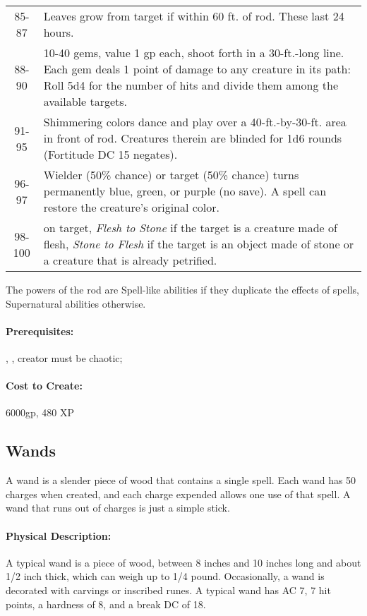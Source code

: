 \begin{table*}
\begin{tabular}{|c|p{}|}
85-87&Leaves grow from target if within 60 ft. of rod. These last 24 hours.\\
88-90&10-40 gems, value 1 gp each, shoot forth in a 30-ft.-long line. Each gem deals 1 point of damage to any creature in its path: Roll 5d4 for the number of hits and divide them among the available targets.\\
91-95&Shimmering colors dance and play over a 40-ft.-by-30-ft. area in front of rod. Creatures therein are blinded for 1d6 rounds (Fortitude DC 15 negates).\\
96-97&Wielder (50\% chance) or target (50\% chance) turns permanently blue, green, or purple (no save). A \nameref{Spell:RemoveCurse} spell can restore the creature's original color.\\
98-100&\nameref{Spell:TransmuteFleshAndStone} on target, \emph{Flesh to Stone} if the target is a creature made of flesh, \emph{Stone to Flesh} if the target is an object made of stone or a creature that is already petrified.\\
\hline
\end{tabular}
\end{table*}
The powers of the rod are Spell-like abilities if they duplicate the effects of spells, Supernatural abilities otherwise.

\paragraph{Prerequisites:} , , creator must be chaotic; 

\paragraph{Cost to Create:} 6000gp, 480 XP
\subsection{Wands}
\label{Item:Wands}
A wand is a slender piece of wood that contains a single spell. Each wand has 50
charges when created, and each charge expended allows one use of that spell. A
wand that runs out of charges is just a simple stick.

\paragraph{Physical Description:} A typical wand is a piece of wood,
between 8 inches and 10 inches long and about 1/2 inch thick, which
can weigh up to 1/4 pound. Occasionally, a wand is decorated with carvings or
inscribed runes. A typical wand has AC 7, 7 hit
points, a hardness of 8, and a break DC of 18.


